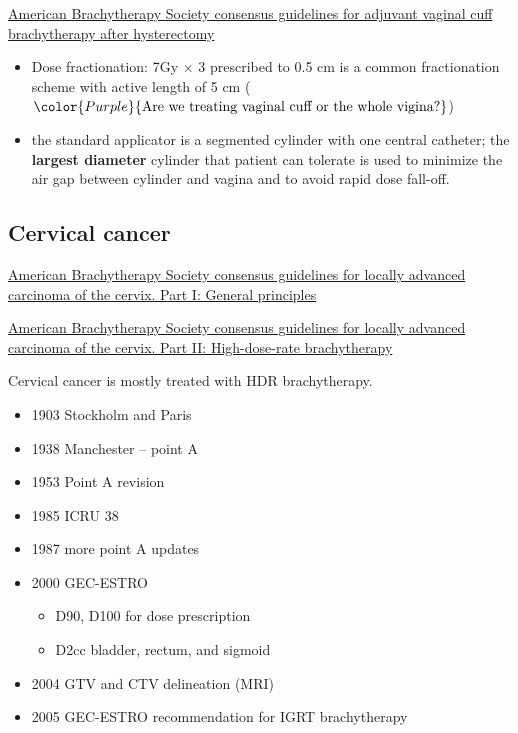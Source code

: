 \documentclass[]{book}
\providecommand{\tightlist}{%
  \setlength{\itemsep}{0pt}\setlength{\parskip}{0pt}}
\theoremstyle{definition}
\theoremstyle{definition}
\theoremstyle{definition}
\theoremstyle{remark}
\begin{document}
\href{https://www.sciencedirect.com/science/article/pii/S1538472111003874?via\%3Dihub}{American
Brachytherapy Society consensus guidelines for adjuvant vaginal cuff
brachytherapy after hysterectomy}

\begin{itemize}
\tightlist
\item
  Dose fractionation: 7Gy \(\times\) 3 prescribed to 0.5 cm is a common
  fractionation scheme with active length of 5 cm
  (\(\color{Purple} {\text{Are we treating vaginal cuff or the whole vigina?}}\))
\item
  the standard applicator is a segmented cylinder with one central
  catheter; the \textbf{largest diameter} cylinder that patient can
  tolerate is used to minimize the air gap between cylinder and vagina
  and to avoid rapid dose fall-off.
\end{itemize}

\subsection{Cervical cancer}\label{cervical}

\href{}{American Brachytherapy Society consensus guidelines for locally
advanced carcinoma of the cervix. Part I: General principles}

\href{https://www.sciencedirect.com/science/article/pii/S1538472111003515}{American
Brachytherapy Society consensus guidelines for locally advanced
carcinoma of the cervix. Part II: High-dose-rate brachytherapy}

Cervical cancer is mostly treated with HDR brachytherapy.

\begin{itemize}
\tightlist
\item
  1903 Stockholm and Paris
\item
  1938 Manchester -- point A
\item
  1953 Point A revision
\item
  1985 ICRU 38
\item
  1987 more point A updates
\item
  2000 GEC-ESTRO

  \begin{itemize}
  \tightlist
  \item
    D90, D100 for dose prescription
  \item
    D2cc bladder, rectum, and sigmoid
  \end{itemize}
\item
  2004 GTV and CTV delineation (MRI)
\item
  2005 GEC-ESTRO recommendation for IGRT brachytherapy
\end{itemize}
\end{document}
